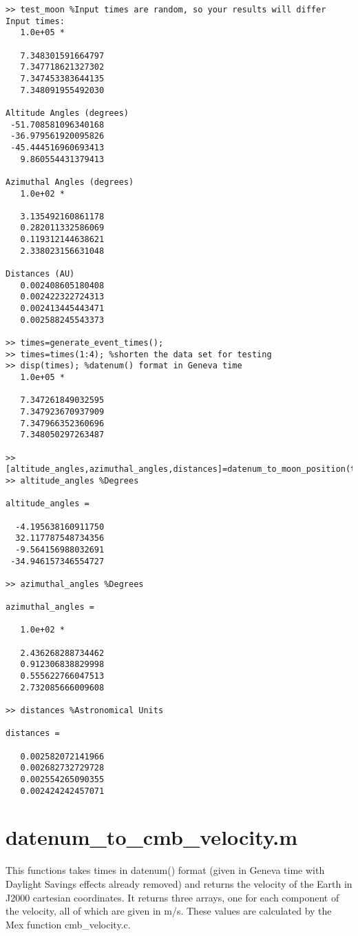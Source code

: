 \documentclass[12pt]{report}
\begin{document}
\begin{verbatim}
>> test_moon %Input times are random, so your results will differ
Input times:
   1.0e+05 *

   7.348301591664797
   7.347718621327302
   7.347453383644135
   7.348091955492030

Altitude Angles (degrees)
 -51.708581096340168
 -36.979561920095826
 -45.444516960693413
   9.860554431379413

Azimuthal Angles (degrees)
   1.0e+02 *

   3.135492160861178
   0.282011332586069
   0.119312144638621
   2.338023156631048

Distances (AU)
   0.002408605180408
   0.002422322724313
   0.002413445443471
   0.002588245543373

>> times=generate_event_times();
>> times=times(1:4); %shorten the data set for testing
>> disp(times); %datenum() format in Geneva time
   1.0e+05 *

   7.347261849032595
   7.347923670937909
   7.347966352360696
   7.348050297263487

>> [altitude_angles,azimuthal_angles,distances]=datenum_to_moon_position(times);
>> altitude_angles %Degrees

altitude_angles =

  -4.195638160911750
  32.117787548734356
  -9.564156988032691
 -34.946157346554727

>> azimuthal_angles %Degrees

azimuthal_angles =

   1.0e+02 *

   2.436268288734462
   0.912306838829998
   0.555622766047513
   2.732085666009608

>> distances %Astronomical Units

distances =

   0.002582072141966
   0.002682732729728
   0.002554265090355
   0.002424242457071
\end{verbatim}

\section{datenum\_to\_cmb\_velocity.m}
This functions takes times in datenum() format (given in Geneva time with Daylight Savings effects already removed) and returns the velocity of the Earth in J2000 cartesian coordinates.  It returns three arrays, one for each component of the velocity, all of which are given in m/s.  These values are calculated by the Mex function cmb\_velocity.c.  
\end{document}
